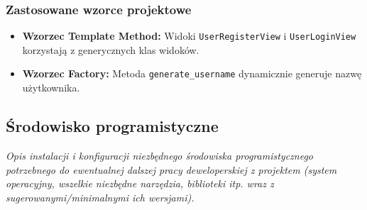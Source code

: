 \documentclass[12pt,a4paper,oneside]{article}
\theoremstyle{definition}
\numberwithin{equation}{section}
\begin{document}
\subsubsection*{Zastosowane wzorce projektowe}

\begin{itemize}
    \item \textbf{Wzorzec Template Method:} Widoki \texttt{UserRegisterView} i \texttt{UserLoginView} korzystają z generycznych klas widoków.
    \item \textbf{Wzorzec Factory:} Metoda \texttt{generate\_username} dynamicznie generuje nazwę użytkownika.
\end{itemize}






\subsection{Środowisko programistyczne}
\textit{Opis instalacji i konfiguracji niezbędnego środowiska programistycznego potrzebnego do ewentualnej dalszej pracy deweloperskiej z projektem (system operacyjny, wszelkie niezbędne narzędzia, biblioteki itp. wraz z sugerowanymi/minimalnymi ich wersjami).}





\renewcommand\refname{Literatura (jeżeli wymagana)}

%
%
%
\end{document}
